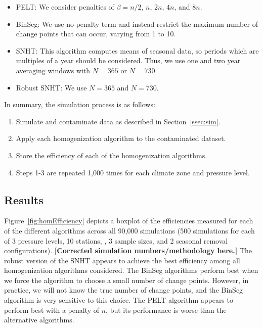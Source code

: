 \documentclass[12pt]{article}
\begin{document}
\begin{doublespacing}
\begin{itemize}
	\item PELT: We consider penalties of $\beta=n/2$, $n$, $2n$, $4n$, and  $8n$.
	\item BinSeg: We use no penalty term and instead restrict the maximum number of change points that can occur, varying from 1 to 10.
	\item SNHT: This algorithm computes means of seasonal data, so periods which are multiples of a year should be considered.  Thus, we use one and two year averaging windows with $N=365$ or $N=730$.
	\item Robust SNHT: We  use $N=365$ and $N= 730$.
\end{itemize}





In summary, the simulation process is as follows:

\begin{enumerate}
	\item Simulate and contaminate data as described in Section~\ref{ssec:sim}.
	\item Apply each homogenization algorithm to the contaminated dataset.
	\item Store the efficiency of each of the homogenization algorithms.
	\item Steps 1-3 are repeated 1,000 times for each climate zone and pressure level.
\end{enumerate}

\subsection{Results}

\label{sec:HomResults}


Figure~\ref{fig:homEfficiency} depicts a boxplot of the efficiencies measured for each of the different algorithms across all 90,000 simulations (500 simulations for each of 3 pressure levels, 10 stations, , 3 sample sizes, and 2 seasonal removal configurations).  \textbf{[Corrected simulation numbers/methodology here.]}  The robust version of the SNHT appears to achieve the best efficiency among all homogenization algorithms considered.  The BinSeg algorithms perform best when we force the algorithm to choose a small number of change points.  However, in practice, we will not know the true number of change points, and the BinSeg algorithm is very sensitive to this choice.  The PELT algorithm appears to perform best with a penalty of $n$, but its performance is  worse than the alternative algorithms.


\end{doublespacing}
\end{document}
